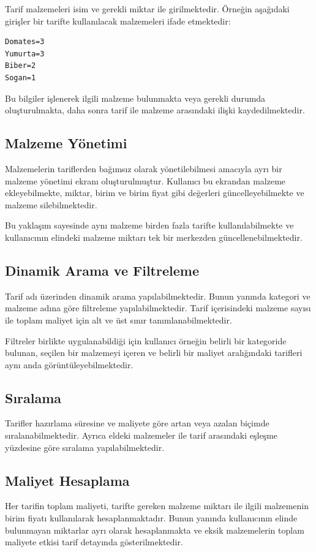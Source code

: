 \documentclass[conference]{IEEEtran}
\begin{document}
Tarif malzemeleri isim ve gerekli miktar ile girilmektedir. Örneğin aşağıdaki girişler bir tarifte kullanılacak malzemeleri ifade etmektedir:

\begin{lstlisting}[basicstyle=\ttfamily\small]
Domates=3
Yumurta=3
Biber=2
Sogan=1
\end{lstlisting}

Bu bilgiler işlenerek ilgili malzeme bulunmakta veya gerekli durumda oluşturulmakta, daha sonra tarif ile malzeme arasındaki ilişki kaydedilmektedir.

\subsection{Malzeme Yönetimi}
Malzemelerin tariflerden bağımsız olarak yönetilebilmesi amacıyla ayrı bir malzeme yönetimi ekranı oluşturulmuştur. Kullanıcı bu ekrandan malzeme ekleyebilmekte, miktar, birim ve birim fiyat gibi değerleri güncelleyebilmekte ve malzeme silebilmektedir.

Bu yaklaşım sayesinde aynı malzeme birden fazla tarifte kullanılabilmekte ve kullanıcının elindeki malzeme miktarı tek bir merkezden güncellenebilmektedir.

\subsection{Dinamik Arama ve Filtreleme}
Tarif adı üzerinden dinamik arama yapılabilmektedir. Bunun yanında kategori ve malzeme adına göre filtreleme yapılabilmektedir. Tarif içerisindeki malzeme sayısı ile toplam maliyet için alt ve üst sınır tanımlanabilmektedir.

Filtreler birlikte uygulanabildiği için kullanıcı örneğin belirli bir kategoride bulunan, seçilen bir malzemeyi içeren ve belirli bir maliyet aralığındaki tarifleri aynı anda görüntüleyebilmektedir.

\subsection{Sıralama}
Tarifler hazırlama süresine ve maliyete göre artan veya azalan biçimde sıralanabilmektedir. Ayrıca eldeki malzemeler ile tarif arasındaki eşleşme yüzdesine göre sıralama yapılabilmektedir.

\subsection{Maliyet Hesaplama}
Her tarifin toplam maliyeti, tarifte gereken malzeme miktarı ile ilgili malzemenin birim fiyatı kullanılarak hesaplanmaktadır. Bunun yanında kullanıcının elinde bulunmayan miktarlar ayrı olarak hesaplanmakta ve eksik malzemelerin toplam maliyete etkisi tarif detayında gösterilmektedir.
\end{document}
